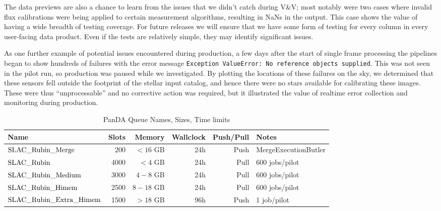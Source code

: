 The data previews are also a chance to learn from the issues that we didn’t catch during V\&V; most
notably were two cases where invalid flux calibrations were being applied to certain measurement
algorithms, resulting in NaNs in the output. This case shows the value of having a wide breadth of
testing coverage. For future releases we will ensure that we have some form of testing for every
column in every user-facing data product. Even if the tests are relatively simple, they may identify
significant issues.

As one further example of potential issues encountered during production, a few days after the start
of single frame processing the pipelines began to show hundreds of failures with the error message
\texttt{Exception ValueError: No reference objects supplied}. This was not seen in the pilot run, so
production was paused while we investigated. By plotting the locations of these failures on the sky,
we determined that these sensors fell outside the footprint of the stellar input catalog, and hence
there were no stars available for calibrating these images. These were thus “unprocessable” and no
corrective action was required, but it illustrated the value of realtime error collection and
monitoring during production.

\normalsize
\begin{center}
\begin{longtable}{|l|r|r|r|r|l|}
\caption{PanDA Queue Names, Sizes, Time limits} \label{tab:pandaqueues}\\
\hline
\textbf{Name}&\textbf{Slots}&\textbf{Memory}&\textbf{Wallclock}&\textbf{Push/Pull}&\textbf{Notes} \\
\hline
$\rm SLAC\_Rubin\_Merge$ & 200 & $<16$ GB & 24h & Push & MergeExecutionButler \\
$\rm SLAC\_Rubin$ & 4000 & $<4$ GB & 24h & Pull & 600 jobs/pilot \\
$\rm SLAC\_Rubin\_Medium$ & 3000 & $4-8$ GB & 24h & Pull &  600 jobs/pilot\\
$\rm SLAC\_Rubin\_Himem$ & 2500& $8-18$ GB & 24h & Pull &  600 jobs/pilot \\
$\rm SLAC\_Rubin\_Extra\_Himem$ & 1500 & $>18$ GB & 96h & Push & 1 job/pilot \\
\hline
\end{longtable}
\end{center}
\normalsize
